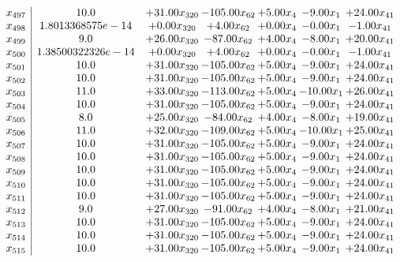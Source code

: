 \documentclass[8pt]{article}
\begin{document}
\[\begin{array}{c| c c@{\hskip 2pt} c@{\hskip 2pt} c@{\hskip 2pt} c@{\hskip 2pt} c@{\hskip 2pt} }
 x_{497}   &  10.0 & + 31.00 x_{320} & -105.00 x_{62} & +  5.00 x_{4} & -9.00 x_{1} & + 24.00 x_{41}\\
 x_{498}   &  1.8013368575e-14 & +  0.00 x_{320} & +  4.00 x_{62} & +  0.00 x_{4} & -0.00 x_{1} & -1.00 x_{41}\\
 x_{499}   &  9.0 & + 26.00 x_{320} & -87.00 x_{62} & +  4.00 x_{4} & -8.00 x_{1} & + 20.00 x_{41}\\
 x_{500}   &  1.38500322326e-14 & +  0.00 x_{320} & +  4.00 x_{62} & +  0.00 x_{4} & -0.00 x_{1} & -1.00 x_{41}\\
 x_{501}   &  10.0 & + 31.00 x_{320} & -105.00 x_{62} & +  5.00 x_{4} & -9.00 x_{1} & + 24.00 x_{41}\\
 x_{502}   &  10.0 & + 31.00 x_{320} & -105.00 x_{62} & +  5.00 x_{4} & -9.00 x_{1} & + 24.00 x_{41}\\
 x_{503}   &  11.0 & + 33.00 x_{320} & -113.00 x_{62} & +  5.00 x_{4} & -10.00 x_{1} & + 26.00 x_{41}\\
 x_{504}   &  10.0 & + 31.00 x_{320} & -105.00 x_{62} & +  5.00 x_{4} & -9.00 x_{1} & + 24.00 x_{41}\\
 x_{505}   &  8.0 & + 25.00 x_{320} & -84.00 x_{62} & +  4.00 x_{4} & -8.00 x_{1} & + 19.00 x_{41}\\
 x_{506}   &  11.0 & + 32.00 x_{320} & -109.00 x_{62} & +  5.00 x_{4} & -10.00 x_{1} & + 25.00 x_{41}\\
 x_{507}   &  10.0 & + 31.00 x_{320} & -105.00 x_{62} & +  5.00 x_{4} & -9.00 x_{1} & + 24.00 x_{41}\\
 x_{508}   &  10.0 & + 31.00 x_{320} & -105.00 x_{62} & +  5.00 x_{4} & -9.00 x_{1} & + 24.00 x_{41}\\
 x_{509}   &  10.0 & + 31.00 x_{320} & -105.00 x_{62} & +  5.00 x_{4} & -9.00 x_{1} & + 24.00 x_{41}\\
 x_{510}   &  10.0 & + 31.00 x_{320} & -105.00 x_{62} & +  5.00 x_{4} & -9.00 x_{1} & + 24.00 x_{41}\\
 x_{511}   &  10.0 & + 31.00 x_{320} & -105.00 x_{62} & +  5.00 x_{4} & -9.00 x_{1} & + 24.00 x_{41}\\
 x_{512}   &  9.0 & + 27.00 x_{320} & -91.00 x_{62} & +  4.00 x_{4} & -8.00 x_{1} & + 21.00 x_{41}\\
 x_{513}   &  10.0 & + 31.00 x_{320} & -105.00 x_{62} & +  5.00 x_{4} & -9.00 x_{1} & + 24.00 x_{41}\\
 x_{514}   &  10.0 & + 31.00 x_{320} & -105.00 x_{62} & +  5.00 x_{4} & -9.00 x_{1} & + 24.00 x_{41}\\
 x_{515}   &  10.0 & + 31.00 x_{320} & -105.00 x_{62} & +  5.00 x_{4} & -9.00 x_{1} & + 24.00 x_{41}\\

\end{array}\]
\end{document}
